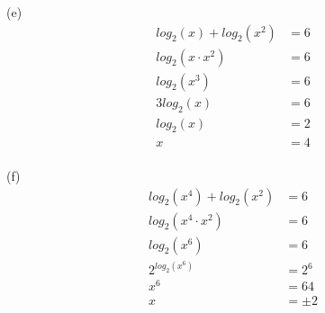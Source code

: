 \begin{exercise}
	(e)
	\begin{align}
		log_2(x) + log_2(x^2) & = 6 \\
		log_2(x \cdot x^2)    & = 6 \\
		log_2(x^3)            & = 6 \\
		3log_2(x)             & = 6 \\
		log_2(x)              & = 2 \\
		x                     & = 4
	\end{align}
	\\
	
	(f)
	\begin{align}
		log_2(x^4) + log_2(x^2) & = 6     \\
		log_2(x^4 \cdot x^2)    & = 6     \\
		log_2(x^6)              & = 6     \\
		2^{log_2(x^6)}          & = 2^6   \\
		x^6                     & = 64    \\
		x                       & = \pm 2
	\end{align}
\end{exercise}

\newpage